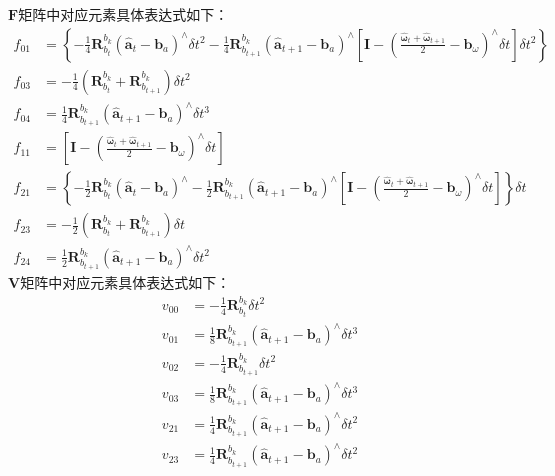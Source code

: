 \begin{enumerate}
	$\bm{F}$矩阵中对应元素具体表达式如下：
	\begin{equation}
	\begin{aligned}	
	f_{01}&=\left\{-\frac{1}{4}\bm{R}_{b_t}^{b_k}\left(\hat{\bm{a}}_t-\bm{b}_a\right)^\wedge\delta t^2-\frac{1}{4}\bm{R}_{b_{t+1}}^{b_k}\left(\hat{\bm{a}}_{t+1}-\bm{b}_a\right)^\wedge\left[\bm{I}-\left(\frac{\hat{\bm{\omega}}_t+\hat{\bm{\omega}}_{t+1}}{2}-\bm{b}_\omega\right)^\wedge\delta t\right]\delta t^2\right\}\\
	f_{03}&=-\frac{1}{4}\left(\bm{R}_{b_t}^{b_k}+\bm{R}_{b_{t+1}}^{b_k}\right)\delta t^2\\
	f_{04}&=\frac{1}{4}\bm{R}_{b_{t+1}}^{b_k}\left(\hat{\bm{a}}_{t+1}-\bm{b}_a\right)^\wedge\delta t^3\\
	f_{11}&=\left[\bm{I}-\left(\frac{\hat{\bm{\omega}}_t+\hat{\bm{\omega}}_{t+1}}{2}-\bm{b}_\omega\right)^\wedge\delta t\right]\\
	f_{21}&=\left\{-\frac{1}{2}\bm{R}_{b_t}^{b_k}\left(\hat{\bm{a}}_t-\bm{b}_a\right)^\wedge-\frac{1}{2}\bm{R}_{b_{t+1}}^{b_k}\left(\hat{\bm{a}}_{t+1}-\bm{b}_a\right)^\wedge\left[\bm{I}-\left(\frac{\hat{\bm{\omega}}_t+\hat{\bm{\omega}}_{t+1}}{2}-\bm{b}_\omega\right)^\wedge\delta t\right]\right\}\delta t\\
	f_{23}&=-\frac{1}{2}\left(\bm{R}_{b_t}^{b_k}+\bm{R}_{b_{t+1}}^{b_k}\right)\delta t\\
	f_{24}&=\frac{1}{2}\bm{R}_{b_{t+1}}^{b_k}\left(\hat{\bm{a}}_{t+1}-\bm{b}_a\right)^\wedge\delta t^2
	\end{aligned}
	\end{equation}
	$\bm{V}$矩阵中对应元素具体表达式如下：
	\begin{equation}
	\begin{aligned}
	v_{00}&=-\frac{1}{4}\bm{R}_{b_t}^{b_k}\delta t^2\\
	v_{01}&=\frac{1}{8}\bm{R}_{b_{t+1}}^{b_k}\left(\hat{\bm{a}}_{t+1}-\bm{b}_a\right)^\wedge\delta t^3\\
	v_{02}&=-\frac{1}{4}\bm{R}_{b_{t+1}}^{b_k}\delta t^2\\
	v_{03}&=\frac{1}{8}\bm{R}_{b_{t+1}}^{b_k}\left(\hat{\bm{a}}_{t+1}-\bm{b}_a\right)^\wedge\delta t^3\\
	v_{21}&=\frac{1}{4}\bm{R}_{b_{t+1}}^{b_k}\left(\hat{\bm{a}}_{t+1}-\bm{b}_a\right)^\wedge\delta t^2\\
	v_{23}&=\frac{1}{4}\bm{R}_{b_{t+1}}^{b_k}\left(\hat{\bm{a}}_{t+1}-\bm{b}_a\right)^\wedge\delta t^2
	\end{aligned}
	\end{equation}
\end{enumerate}